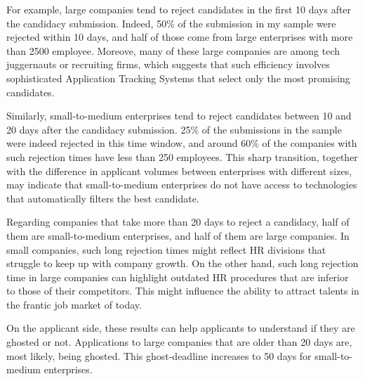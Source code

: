 \documentclass[12pt]{article}
\begin{document}
For example, large companies tend to reject candidates in the first 10 days after the candidacy submission. Indeed, 50\% of the submission in my sample were rejected within 10 days, and half of those come from large enterprises with more than 2500 employee. Moreove, many of these large companies are among tech juggernauts or recruiting firms, which suggests that such efficiency involves sophisticated Application Tracking Systems  that select only the most promising candidates. 

Similarly, small-to-medium enterprises tend to reject candidates between 10 and 20 days after the candidacy submission. 25\% of the submissions in the sample were indeed rejected in this time window, and around 60\% of the companies with such rejection times have less than 250 employees. This sharp transition, together with the difference in applicant volumes between enterprises with different sizes, may indicate that small-to-medium enterprises do not have access to technologies that automatically filters the best candidate. 

Regarding companies that take more than 20 days to reject a candidacy, half of them are small-to-medium enterprises, and half of them are large companies. In small companies, such long rejection times might reflect HR divisions that struggle to keep up with company growth. On the other hand, such long rejection time in large companies can highlight outdated HR procedures that are inferior to those of their competitors. This might influence the ability to attract talents in the frantic job market of today.

On the applicant side, these results can help applicants to understand if they are ghosted or not. Applications to large companies that are older than 20 days are, most likely, being ghosted. This ghost-deadline increases to 50 days for small-to-medium enterprises.
\end{document}

